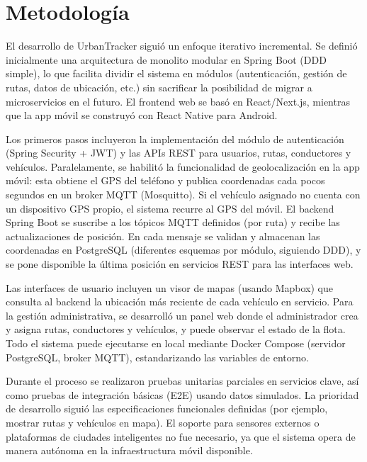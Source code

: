 \section{Metodología}
El desarrollo de UrbanTracker siguió un enfoque iterativo incremental. Se definió inicialmente una arquitectura de monolito modular en Spring Boot (DDD simple), lo que facilita dividir el sistema en módulos (autenticación, gestión de rutas, datos de ubicación, etc.) sin sacrificar la posibilidad de migrar a microservicios en el futuro. El frontend web se basó en React/Next.js, mientras que la app móvil se construyó con React Native para Android.

Los primeros pasos incluyeron la implementación del módulo de autenticación (Spring Security + JWT) y las APIs REST para usuarios, rutas, conductores y vehículos. Paralelamente, se habilitó la funcionalidad de geolocalización en la app móvil: esta obtiene el GPS del teléfono y publica coordenadas cada pocos segundos en un broker MQTT (Mosquitto). Si el vehículo asignado no cuenta con un dispositivo GPS propio, el sistema recurre al GPS del móvil. El backend Spring Boot se suscribe a los tópicos MQTT definidos (por ruta) y recibe las actualizaciones de posición. En cada mensaje se validan y almacenan las coordenadas en PostgreSQL (diferentes esquemas por módulo, siguiendo DDD), y se pone disponible la última posición en servicios REST para las interfaces web.

Las interfaces de usuario incluyen un visor de mapas (usando Mapbox) que consulta al backend la ubicación más reciente de cada vehículo en servicio. Para la gestión administrativa, se desarrolló un panel web donde el administrador crea y asigna rutas, conductores y vehículos, y puede observar el estado de la flota. Todo el sistema puede ejecutarse en local mediante Docker Compose (servidor PostgreSQL, broker MQTT), estandarizando las variables de entorno.

Durante el proceso se realizaron pruebas unitarias parciales en servicios clave, así como pruebas de integración básicas (E2E) usando datos simulados. La prioridad de desarrollo siguió las especificaciones funcionales definidas (por ejemplo, mostrar rutas y vehículos en mapa). El soporte para sensores externos o plataformas de ciudades inteligentes no fue necesario, ya que el sistema opera de manera autónoma en la infraestructura móvil disponible.